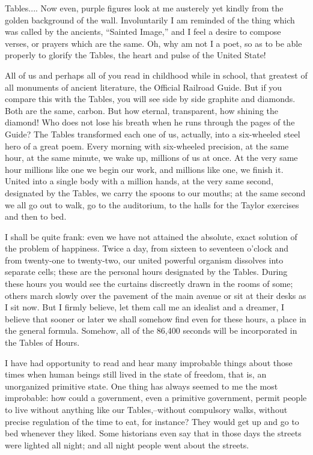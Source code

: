 \documentclass[11pt,openany]{book}
\begin{document}
Tables.... Now even, purple figures look at me austerely yet kindly from the golden background of the wall. Involuntarily I am reminded of the thing which was called by the ancients, ``Sainted Image,'' and I feel a desire to compose verses, or prayers which are the same. Oh, why am not I a poet, so as to be able properly to glorify the Tables, the heart and pulse of the United State!

All of us and perhaps all of you read in childhood while in school, that greatest of all monuments of ancient literature, the Official Railroad Guide. But if you compare this with the Tables, you will see side by side graphite and diamonds. Both are the same, carbon. But how eternal, transparent, how shining the diamond! Who does not lose his breath when he runs through the pages of the Guide? The Tables transformed each one of us, actually, into a six-wheeled steel hero of a great poem. Every morning with six-wheeled precision, at the same hour, at the same minute, we wake up, millions of us at once. At the very same hour millions like one we begin our work, and millions like one, we finish it. United into a single body with a million hands, at the very same second, designated by the Tables, we carry the spoons to our mouths; at the same second we all go out to walk, go to the auditorium, to the halls for the Taylor exercises and then to bed.

I shall be quite frank: even we have not attained the absolute, exact solution of the problem of happiness. Twice a day, from sixteen to seventeen o'clock and from twenty-one to twenty-two, our united powerful organism dissolves into separate cells; these are the personal hours designated by the Tables. During these hours you would see the curtains discreetly drawn in the rooms of some; others march slowly over the pavement of the main avenue or sit at their desks as I sit now. But I firmly believe, let them call me an idealist and a dreamer, I believe that sooner or later we shall somehow find even for these hours, a place in the general formula. Somehow, all of the 86,400 seconds will be incorporated in the Tables of Hours.

I have had opportunity to read and hear many improbable things about those times when human beings still lived in the state of freedom, that is, an unorganized primitive state. One thing has always seemed to me the most improbable: how could a government, even a primitive government, permit people to live without anything like our Tables,--without compulsory walks, without precise regulation of the time to eat, for instance? They would get up and go to bed whenever they liked. Some historians even say that in those days the streets were lighted all night; and all night people went about the streets.
\end{document}
